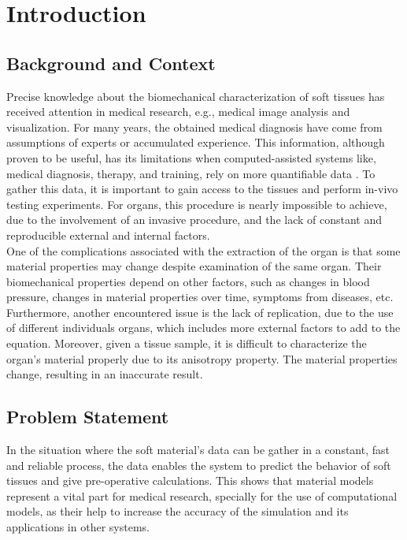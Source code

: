 
\chapter{Introduction} %

\label{Chapter2} %

\section{Background and Context}

Precise knowledge about the biomechanical characterization of soft tissues has received attention
in medical research, e.g., medical image analysis and visualization.
For many years, the obtained medical diagnosis have come from assumptions of experts or 
accumulated experience. This information, although proven to be useful, has its limitations 
when computed-assisted systems like, medical diagnosis, therapy, and training, rely on 
more quantifiable data \cite{Kauer2002}. To gather this data, it is important to gain access
to the tissues and perform in-vivo testing experiments. For organs, this procedure is nearly 
impossible to achieve, due to the involvement of an invasive procedure, and the lack of constant
and reproducible external and internal factors. \\ 

One of the complications associated with the extraction of the organ is that some material 
properties may change despite examination of the same organ. Their biomechanical properties 
depend on other factors, such as changes in blood pressure, changes in material properties 
over time, symptoms from diseases, etc. Furthermore, another encountered issue is the lack 
of replication, due to the use of different individuals organs, which includes more external
 factors to add to the equation. Moreover, given a tissue sample, it is difficult to 
 characterize the organ's material properly due to its anisotropy property. The material 
 properties change, resulting in an inaccurate result.
\\

\section{Problem Statement}
In the situation where the soft material's data can be gather in a constant, fast and reliable
process, the data enables the system to predict the behavior of soft tissues and give pre-operative
 calculations. This shows that material models represent a vital part for medical research, 
 specially for the use of computational models, as their help to increase the accuracy of the 
 simulation and its applications in other systems.\\

